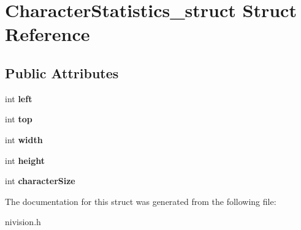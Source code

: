 \hypertarget{structCharacterStatistics__struct}{\section{\-Character\-Statistics\-\_\-struct \-Struct \-Reference}
\label{structCharacterStatistics__struct}
}
\subsection*{\-Public \-Attributes}
\begin{DoxyCompactItemize}
\item 
\hypertarget{structCharacterStatistics__struct_a95a86971db14027020e5627684e8dbcd}{int {\bfseries left}}\label{structCharacterStatistics__struct_a95a86971db14027020e5627684e8dbcd}

\item 
\hypertarget{structCharacterStatistics__struct_ae999a3ffa6542faf6b9070114d70446f}{int {\bfseries top}}\label{structCharacterStatistics__struct_ae999a3ffa6542faf6b9070114d70446f}

\item 
\hypertarget{structCharacterStatistics__struct_ab9db5dd5e023bfb437a9158f5d4a7f4a}{int {\bfseries width}}\label{structCharacterStatistics__struct_ab9db5dd5e023bfb437a9158f5d4a7f4a}

\item 
\hypertarget{structCharacterStatistics__struct_a21d88abb2b9f4940602916d352e7b124}{int {\bfseries height}}\label{structCharacterStatistics__struct_a21d88abb2b9f4940602916d352e7b124}

\item 
\hypertarget{structCharacterStatistics__struct_aead1343945172e4583abd53c8d2babd5}{int {\bfseries character\-Size}}\label{structCharacterStatistics__struct_aead1343945172e4583abd53c8d2babd5}

\end{DoxyCompactItemize}


\-The documentation for this struct was generated from the following file\-:\begin{DoxyCompactItemize}
\item 
nivision.\-h\end{DoxyCompactItemize}
